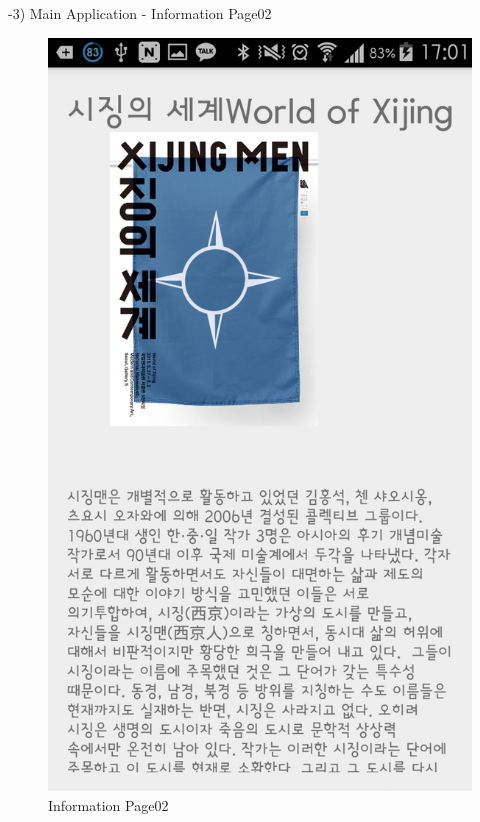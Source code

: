 \documentclass[conference]{IEEEtran}
\begin{document}
-3) Main Application - Information Page02
\begin{figure}[htbp]
\begin{center}
    \includegraphics[scale=0.2]{img_capture08}
    \caption{Information Page02} 
\end{center}
\end{figure}
\end{document}
